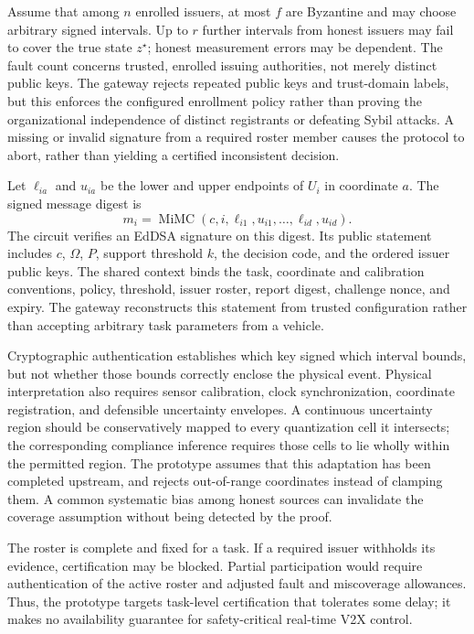 Assume that among $n$ enrolled issuers, at most $f$ are Byzantine and may choose arbitrary signed intervals. Up to $r$ further intervals from honest issuers may fail to cover the true state $z^\star$; honest measurement errors may be dependent. The fault count concerns trusted, enrolled issuing authorities, not merely distinct public keys. The gateway rejects repeated public keys and trust-domain labels, but this enforces the configured enrollment policy rather than proving the organizational independence of distinct registrants or defeating Sybil attacks. A missing or invalid signature from a required roster member causes the protocol to abort, rather than yielding a certified inconsistent decision.

Let $\ell_{ia}$ and $u_{ia}$ be the lower and upper endpoints of $U_i$ in coordinate $a$. The signed message digest is
\begin{equation}\label{eq:signedbox}
m_i=\operatorname{MiMC}(c,i,\ell_{i1},u_{i1},\ldots,\ell_{id},u_{id}).
\end{equation}
The circuit verifies an EdDSA signature on this digest. Its public statement includes $c$, $\Omega$, $P$, support threshold $k$, the decision code, and the ordered issuer public keys. The shared context binds the task, coordinate and calibration conventions, policy, threshold, issuer roster, report digest, challenge nonce, and expiry. The gateway reconstructs this statement from trusted configuration rather than accepting arbitrary task parameters from a vehicle.

Cryptographic authentication establishes which key signed which interval bounds, but not whether those bounds correctly enclose the physical event. Physical interpretation also requires sensor calibration, clock synchronization, coordinate registration, and defensible uncertainty envelopes. A continuous uncertainty region should be conservatively mapped to every quantization cell it intersects; the corresponding compliance inference requires those cells to lie wholly within the permitted region. The prototype assumes that this adaptation has been completed upstream, and rejects out-of-range coordinates instead of clamping them. A common systematic bias among honest sources can invalidate the coverage assumption without being detected by the proof.

The roster is complete and fixed for a task. If a required issuer withholds its evidence, certification may be blocked. Partial participation would require authentication of the active roster and adjusted fault and miscoverage allowances. Thus, the prototype targets task-level certification that tolerates some delay; it makes no availability guarantee for safety-critical real-time V2X control.
